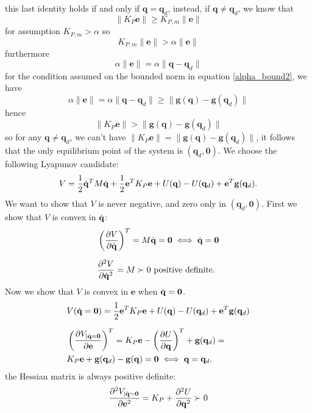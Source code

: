 \documentclass[10pt, a4paper]{report}
\newcommand{\q}{{\mathbf q}}
\begin{document}
this last identity holds if and only if $\q=\q_d$, instead, if  $\q\ne \q_d$, we know that\begin{equation}
    \|K_P\mathbf e\|\ge K_{P,m}\|\mathbf e\|
\end{equation}
for assumption $K_{P,m}>\alpha$ so\begin{equation}
    K_{P,m}\|\mathbf e\|>\alpha\|\mathbf e\|
\end{equation}
furthermore\begin{equation}
    \alpha\|\mathbf e\|=\alpha\|\q-\q_d\|
\end{equation}
for the condition assumed on the bounded norm in equation \eqref{alpha_bound2}, we have\begin{equation}
    \alpha\|\mathbf e\|=\alpha\|\q-\q_d\|\ge \|\mathbf g(\q)-\mathbf g(\q_d)\|
\end{equation}
hence\begin{equation}
     \|K_P\mathbf e\|> \|\mathbf g(\q)-\mathbf g(\q_d)\|
\end{equation}
so for any $\q\ne \q_d$, we can't have $\|K_P\mathbf e\| = \|\mathbf g(\q)-\mathbf g(\q_d)\|$, it follows that the only equilibrium point of the system is $(\q_d,\mathbf 0)$. We choose the following Lyapunov candidate:\begin{equation}
    V=\frac{1}{2}\dq^TM\dq+\frac{1}{2}\mathbf e^TK_P\mathbf e+U(\q)-U(\q_d)+\mathbf e^T\mathbf g(\q_d).
\end{equation}
We want to show that $V$ is never negative, and zero only in $(\q_d,\mathbf 0)$. First we show that $V$ is convex in ${\dot{\mathbf q}}$:\begin{align}
    &\left(\frac{\partial V}{\partial {\dot{\mathbf q}}}\right)^T=M{\dot{\mathbf q}}=\mathbf 0 \iff {\dot{\mathbf q}}=\mathbf 0\\[1.5ex]
    &\frac{\partial^2 V}{\partial {\dot{\mathbf q}}^2}=M\succ 0 \text{ positive definite.}
\end{align}
Now we show that $V$ is convex in $\mathbf e$ when ${\dot{\mathbf q}}=\mathbf 0$. \begin{align}
    &V(\dq=\mathbf 0)=\frac{1}{2}\mathbf e^TK_P\mathbf e+U(\q)-U(\q_d)+\mathbf e^T\mathbf g(\q_d)\\[1.5ex]
    &\left(\frac{\partial V_{|\dq=\mathbf 0}}{\partial\mathbf e}\right)^T
    =K_P\mathbf e-\left(\frac{\partial U}{\partial \q}\right)^T+\mathbf g(\q_d)=\\
    &K_P\mathbf e+\mathbf g(\q_d)-\mathbf g(\q)=\mathbf 0 \iff \q=\q_d.
\end{align}
the Hessian matrix is always positive definite:\begin{equation}
    \frac{\partial^2 V_{|\dq=\mathbf 0}}{\partial\mathbf e^2}=K_P+\frac{\partial^2 U}{\partial \q^2}\succ 0 
\end{equation}
\end{document}
